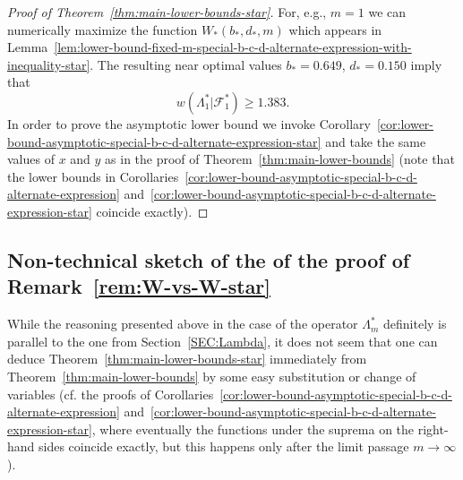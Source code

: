 \documentclass[a4paper]{amsart} %
\theoremstyle{definition}
\theoremstyle{remark}
\numberwithin{equation}{section}
\newcommand*{\weakconstrestricted}[2]{w(#1|#2)} %
\newcommand*{\fclassspecStar}[1]{\mathcal{F}_{#1}^*}
\newcommand*{\bStar}{b_*}
\newcommand*{\dStar}{d_*}
\newcommand*{\XXXspecialbdStar}{W_*}
\begin{document}
\begin{proof}[Proof of Theorem~\ref{thm:main-lower-bounds-star}]
	For, e.g., $m=1$ we can numerically maximize the function $\XXXspecialbdStar(\bStar,\dStar,m)$
	which appears in Lemma~\ref{lem:lower-bound-fixed-m-special-b-c-d-alternate-expression-with-inequality-star}.
	The resulting near optimal values $\bStar = 0.649$, $\dStar = 0.150$ imply that 
	\[
	\weakconstrestricted{\Lambda_1^*}{\fclassspecStar{1}} \geq 1.383.
	\]
	In order to prove the asymptotic lower bound we invoke Corollary~\ref{cor:lower-bound-asymptotic-special-b-c-d-alternate-expression-star}
	and take the same values of $x$ and $y$ as in the proof of Theorem~\ref{thm:main-lower-bounds} (note that the lower bounds in Corollaries~\ref{cor:lower-bound-asymptotic-special-b-c-d-alternate-expression} and~\ref{cor:lower-bound-asymptotic-special-b-c-d-alternate-expression-star} coincide exactly).
\end{proof}



\subsection{Non-technical sketch of the of the proof of Remark~\ref{rem:W-vs-W-star}}

While the reasoning presented above in the case of the operator $\Lambda_m^*$ definitely is parallel to the one from Section~\ref{SEC:Lambda},
it does not seem that one can deduce Theorem~\ref{thm:main-lower-bounds-star} immediately from Theorem~\ref{thm:main-lower-bounds} by some easy substitution or change of variables (cf. the proofs of Corollaries~\ref{cor:lower-bound-asymptotic-special-b-c-d-alternate-expression} and~\ref{cor:lower-bound-asymptotic-special-b-c-d-alternate-expression-star},
where eventually the functions under the suprema on the right-hand sides coincide exactly,
but this happens only after the limit passage $m\to\infty$).
\end{document}
